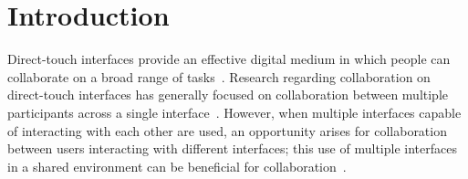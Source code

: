 \documentclass{bmcart}
\begin{document}
\begin{frontmatter}
\begin{abstractbox}

\begin{keyword}
\end{keyword}


\end{abstractbox}
%

\end{frontmatter}




\section*{Introduction}\label{sec:intro}

Direct-touch interfaces provide an effective digital medium in which people can collaborate on a broad range of tasks~\cite{Marshall2008}. 
Research regarding collaboration on direct-touch interfaces has generally focused on collaboration between multiple participants across a single interface~\cite{Piper2009,Rick2009,Ryall2006a}. 
However, when multiple interfaces capable of interacting with each
other are used, an opportunity arises for collaboration between users interacting with different interfaces; this use of multiple interfaces in a shared environment can be beneficial for collaboration~\cite{Wallace2008a,Wallace2009}.
\end{document}
